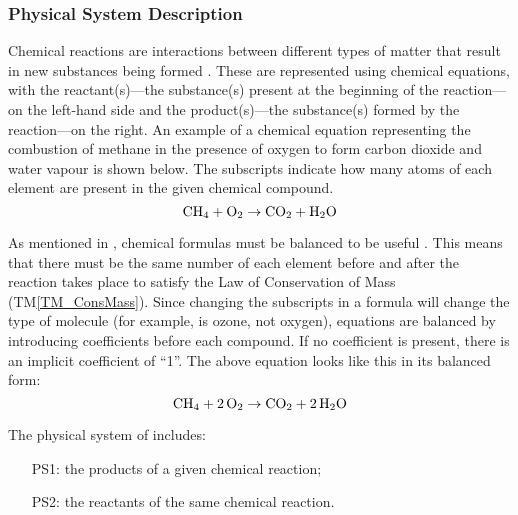 \documentclass[12pt]{article}
\newcommand{\tmref}[1]{TM\ref{#1}}
\begin{document}
\subsubsection{Physical System Description} \label{sec_phySystDesc}

Chemical reactions are interactions between different types of matter that
result in new substances being formed \cite[p. 286]{lund_introduction_2023}.
These are represented using chemical equations, with the reactant(s)---the
substance(s) present at the beginning of the reaction---on the left-hand side
and the product(s)---the substance(s) formed by the reaction---on the right. An
example of a chemical equation representing the combustion of methane in the
presence of oxygen to form carbon dioxide and water vapour is shown below. The
subscripts indicate how many atoms of each element are present in the given
chemical compound.
$$
  \ce{CH4} + \ce{O2} \rightarrow \ce{CO2} + \ce{H2O}
$$

As mentioned in , chemical formulas must be balanced to be
useful \cite{lund_introduction_2023}. This means that there
must be the same number of each element before and after the reaction takes
place to satisfy the Law of Conservation of Mass (\tmref{TM_ConsMass}). Since
changing the subscripts in a formula will change the type of molecule (for
example,  is ozone, not oxygen), equations are balanced by introducing
coefficients before each compound. If no coefficient is present, there is an
implicit coefficient of ``1''. The above equation looks like this in its
balanced form:
$$
  \ce{CH4} + \ce{2O2} \rightarrow \ce{CO2} + \ce{2H2O}
$$

The physical system of \progname{} includes:

\begin{itemize}

  \item[PS1:] the products of a given chemical reaction;

  \item[PS2:] the reactants of the same chemical reaction.

\end{itemize}

\end{document}
